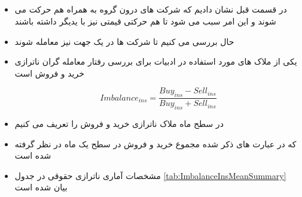 \documentclass[12pt, a4paper]{article}
\begin{document}
 \subsection{}
 \begin{itemize}
 	\item 
 	در قسمت قبل نشان دادیم که شرکت های درون گروه به همراه هم حرکت می شوند و این امر سبب می شود تا هم حرکتی قیمتی نیز با یدیگر داشته باشند
 	\item
 	حال بررسی می کنیم تا شرکت ها در یک جهت نیز معامله شوند
 	\item
 	یکی از ملاک های مورد استفاده در ادبیات برای بررسی رفتار معامله گران  ناترازی خرید و فروش است
 	
 
 		\begin{equation}
 			Imbalance_{ins} = \frac{Buy_{ins} - Sell_{ins}}{Buy_{ins} + Sell_{ins}}
 		\end{equation}

 	\item 
 	در سطح ماه ملاک ناترازی خرید و فروش را تعریف می کنیم
 	\item 
 	که در عبارت های ذکر شده مجموع خرید و فروش در سطح یک ماه در نظر گرفته شده است
 	\item 
 	مشخصات آماری ناترازی حقوقی در جدول 
 	\ref{tab:ImbalanceInsMeanSummary}
 	بیان شده است
  	\begin{LTR}
 \end{LTR}

 \end{itemize}
 \FloatBarrier
 
\end{document}
